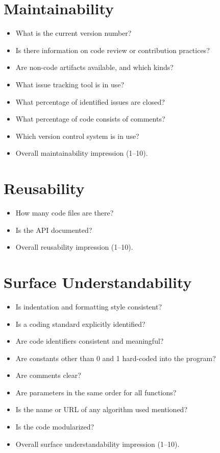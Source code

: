 \section*{Maintainability}

\begin{itemize}
    \item What is the current version number?
    \item Is there information on code review or contribution practices?
    \item Are non-code artifacts available, and which kinds?
    \item What issue tracking tool is in use?
    \item What percentage of identified issues are closed?
    \item What percentage of code consists of comments?
    \item Which version control system is in use?
    \item Overall maintainability impression (1--10).
\end{itemize}

\section*{Reusability}

\begin{itemize}
    \item How many code files are there?
    \item Is the API documented?
    \item Overall reusability impression (1--10).
\end{itemize}

\section*{Surface Understandability}

\begin{itemize}
    \item Is indentation and formatting style consistent?
    \item Is a coding standard explicitly identified?
    \item Are code identifiers consistent and meaningful?
    \item Are constants other than 0 and 1 hard-coded into the program?
    \item Are comments clear?
    \item Are parameters in the same order for all functions?
    \item Is the name or URL of any algorithm used mentioned?
    \item Is the code modularized?
    \item Overall surface understandability impression (1--10).
\end{itemize}

